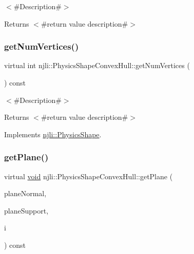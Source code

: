 $<$\#\+Description\#$>$

\begin{DoxyReturn}{Returns}
$<$\#return value description\#$>$ 
\end{DoxyReturn}
\mbox{\label{classnjli_1_1_physics_shape_convex_hull_a14ad34853c7049de052a460fe1f349c2}} 
\subsubsection{\texorpdfstring{get\+Num\+Vertices()}{getNumVertices()}}
{\footnotesize\ttfamily virtual int njli\+::\+Physics\+Shape\+Convex\+Hull\+::get\+Num\+Vertices (\begin{DoxyParamCaption}{ }\end{DoxyParamCaption}) const\hspace{0.3cm}{\ttfamily [virtual]}}

$<$\#\+Description\#$>$

\begin{DoxyReturn}{Returns}
$<$\#return value description\#$>$ 
\end{DoxyReturn}


Implements \mbox{\hyperlink{classnjli_1_1_physics_shape_ac3f7cc28341fd58ace164bf8666480f0}{njli\+::\+Physics\+Shape}}.

\mbox{\label{classnjli_1_1_physics_shape_convex_hull_ad7658f47a3acc7825453650f22dd72c5}} 
\subsubsection{\texorpdfstring{get\+Plane()}{getPlane()}}
{\footnotesize\ttfamily virtual \mbox{\hyperlink{_thread_8h_af1e856da2e658414cb2456cb6f7ebc66}{void}} njli\+::\+Physics\+Shape\+Convex\+Hull\+::get\+Plane (\begin{DoxyParamCaption}\item[{bt\+Vector3 \&}]{plane\+Normal,  }\item[{bt\+Vector3 \&}]{plane\+Support,  }\item[{int}]{i }\end{DoxyParamCaption}) const\hspace{0.3cm}{\ttfamily [virtual]}}

